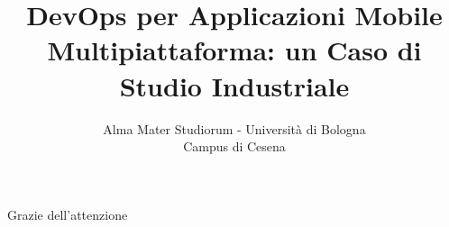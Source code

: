 \documentclass[10pt]{beamer}
\title[]{DevOps per Applicazioni Mobile Multipiattaforma: un Caso di Studio Industriale}
\institute[]{}
\author[Filippo Paganelli]{Alma Mater Studiorum - Università di Bologna \\ Campus di Cesena}
\date[\textcolor{white}{A.A. 21/22}]
{
\begin{columns}[onlytextwidth]
    \begin{column}{0.5\textwidth}
        \begin{flushleft}
            Relatore:\\
            \textbf{Prof. Danilo Pianini}\\
            \vspace{3mm}
            Correlatore:\\
            \textbf{Prof.ssa Catia Prandi}
        \end{flushleft}
    \end{column}
        \begin{column}{0.5\textwidth}
        \begin{flushright}
            Presentata da:\\
            \textbf{Filippo Paganelli}
        \end{flushright}
    \end{column}
\end{columns}
\vspace{10mm}
A.A. 21/22 \\ III Sessione
}
\begin{document}
\frame{\titlepage}







\begin{frame}
    \begin{center}
        \LARGE Grazie dell'attenzione
    \end{center}
\end{frame}
\end{document}
